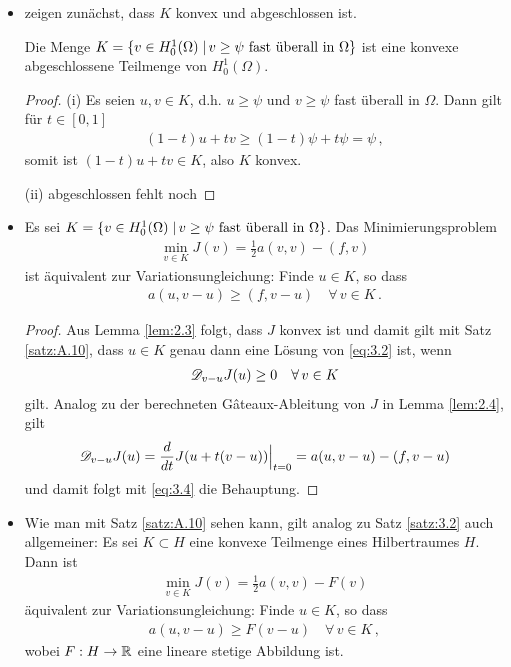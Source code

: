 \begin{itemize}
\item zeigen zunächst, dass $K$ konvex und abgeschlossen ist.
\begin{lemma}\label{lem:3.1}
Die Menge $K =  \{v \in H^1_0(\Omega) \;\vert\, v\ge \psi\text{ fast überall in }\Omega\}$ ist eine konvexe abgeschlossene Teilmenge von $H^1_0(\Omega)$.
\end{lemma}

\begin{proof}
(i) Es seien $u,v \in K$, d.h. $u \ge \psi$ und $v \ge \psi$ fast überall in $\Omega$. Dann gilt für $t \in [0,1]$
\begin{align*}
	(1-t) u + tv \ge (1-t)\psi + t \psi = \psi  \, ,
\end{align*}
somit ist $(1-t)u + tv \in K$, also $K$ konvex.

(ii) abgeschlossen fehlt noch
\end{proof}

\item \begin{satz}\label{satz:3.2}
Es sei $K =   \{v \in H^1_0(\Omega) \;\vert\, v\ge \psi\text{ fast überall in }\Omega\}$. Das Minimierungsproblem
\begin{align}\label{eq:3.2}
	\min_{v\in K} J(v) = \frac 1 2 a(v,v)-(f,v)
\end{align}
ist äquivalent zur Variationsungleichung: Finde $u \in K$, so dass
\begin{align}\label{eq:3.3}
	a(u,v-u) \ge (f,v-u) \quad \forall \, v \in K \, .
\end{align}
\end{satz}

\begin{proof}
Aus Lemma \ref{lem:2.3} folgt, dass $J$ konvex ist und damit gilt mit Satz \ref{satz:A.10}, dass $u \in K$ genau dann eine Lösung von \eqref{eq:3.2} ist, wenn
\begin{align}\label{eq:3.4}
	\mathscr D_{v-u} J(u) \ge 0 \quad \forall \, v \in K 
\end{align}
gilt. Analog zu der berechneten Gâteaux-Ableitung von $J$ in Lemma \ref{lem:2.4}, gilt
\[
	\mathscr D_{v-u} J(u) = \frac d{dt} J(u+t(v-u))\Big|_{t=0} = a(u,v-u) -(f,v-u)
\]
und damit folgt mit \eqref{eq:3.4} die Behauptung.
\end{proof}

\item \begin{bem}
Wie man mit Satz \ref{satz:A.10} sehen kann, gilt analog zu Satz \ref{satz:3.2} auch allgemeiner: Es sei $K\subset H$ eine konvexe Teilmenge eines Hilbertraumes $H$. Dann ist
\begin{align*}
	\min_{v\in K} J(v) = \frac 1 2 a(v,v)-F(v)
\end{align*}
äquivalent zur Variationsungleichung: Finde $u \in K$, so dass
\begin{align*}
	a(u,v-u) \ge F(v-u) \quad \forall \, v \in K \, ,
\end{align*}
wobei $F :H\rightarrow \mathbb{R}$ eine lineare stetige Abbildung ist.
\end{bem}


\end{itemize}

